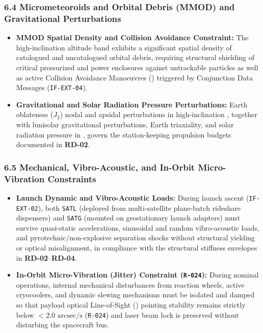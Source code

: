 \subsubsection{6.4 Micrometeoroids and Orbital Debris (MMOD) and Gravitational Perturbations}

\begin{itemize}
    \item \textbf{MMOD Spatial Density and Collision Avoidance Constraint:} The high-inclination  altitude band exhibits a significant spatial density of catalogued and uncatalogued orbital debris, requiring structural shielding of critical pressurized and power enclosures against untrackable particles as well as active Collision Avoidance Manoeuvres () triggered by Conjunction Data Messages (\texttt{IF-EXT-04}).
    \item \textbf{Gravitational and Solar Radiation Pressure Perturbations:} Earth oblateness ($J_2$) nodal and apsidal perturbations in high-inclination , together with lunisolar gravitational perturbations, Earth triaxiality, and solar radiation pressure in , govern the station-keeping propulsion budgets documented in \textbf{RD-02}.
\end{itemize}

\subsubsection{6.5 Mechanical, Vibro-Acoustic, and In-Orbit Micro-Vibration Constraints}

\begin{itemize}
    \item \textbf{Launch Dynamic and Vibro-Acoustic Loads:} During launch ascent (\texttt{IF-EXT-02}), both \texttt{SATL} (deployed from multi-satellite plane-batch rideshare dispensers) and \texttt{SATG} (mounted on geostationary launch adapters) must survive quasi-static accelerations, sinusoidal and random vibro-acoustic loads, and pyrotechnic/non-explosive separation shocks without structural yielding or optical misalignment, in compliance with the structural stiffness envelopes in \textbf{RD-02}--\textbf{RD-04}.
    \item \textbf{In-Orbit Micro-Vibration (Jitter) Constraint (\texttt{R-024}):} During nominal operations, internal mechanical disturbances from reaction wheels, active cryocoolers, and dynamic slewing mechanisms must be isolated and damped so that payload optical Line-of-Sight () pointing stability remains strictly below $< 2.0\text{ arcsec/s}$ (\texttt{R-024}) and laser  beam lock is preserved without disturbing the spacecraft bus.
\end{itemize}

